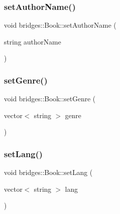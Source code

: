\subsubsection{\texorpdfstring{set\+Author\+Name()}{setAuthorName()}}
{\footnotesize\ttfamily void bridges\+::\+Book\+::set\+Author\+Name (\begin{DoxyParamCaption}\item[{string}]{author\+Name }\end{DoxyParamCaption})\hspace{0.3cm}{\ttfamily [inline]}}

\hypertarget{classbridges_1_1_book_a599852c24b9093e04fb124f21cb31419}{}\label{classbridges_1_1_book_a599852c24b9093e04fb124f21cb31419} 
\subsubsection{\texorpdfstring{set\+Genre()}{setGenre()}}
{\footnotesize\ttfamily void bridges\+::\+Book\+::set\+Genre (\begin{DoxyParamCaption}\item[{vector$<$ string $>$}]{genre }\end{DoxyParamCaption})\hspace{0.3cm}{\ttfamily [inline]}}

\hypertarget{classbridges_1_1_book_acec57a03086884a8ebae4c608c19e5cf}{}\label{classbridges_1_1_book_acec57a03086884a8ebae4c608c19e5cf} 
\subsubsection{\texorpdfstring{set\+Lang()}{setLang()}}
{\footnotesize\ttfamily void bridges\+::\+Book\+::set\+Lang (\begin{DoxyParamCaption}\item[{vector$<$ string $>$}]{lang }\end{DoxyParamCaption})\hspace{0.3cm}{\ttfamily [inline]}}

\hypertarget{classbridges_1_1_book_a31f85f174ab86e6f9eb2131c3dbe1cdf}{}\label{classbridges_1_1_book_a31f85f174ab86e6f9eb2131c3dbe1cdf} 
